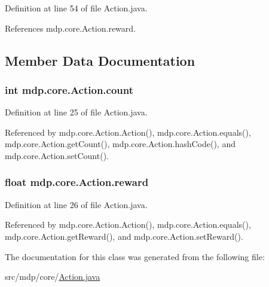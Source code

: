 Definition at line 54 of file Action.\+java.



References mdp.\+core.\+Action.\+reward.



\subsection{Member Data Documentation}
\hypertarget{classmdp_1_1core_1_1_action_a3fd6370ee73fdac8ec8e84e12f02f261}{}
\subsubsection[{count}]{\setlength{\rightskip}{0pt plus 5cm}int mdp.\+core.\+Action.\+count\hspace{0.3cm}{\ttfamily [private]}}\label{classmdp_1_1core_1_1_action_a3fd6370ee73fdac8ec8e84e12f02f261}


Definition at line 25 of file Action.\+java.



Referenced by mdp.\+core.\+Action.\+Action(), mdp.\+core.\+Action.\+equals(), mdp.\+core.\+Action.\+get\+Count(), mdp.\+core.\+Action.\+hash\+Code(), and mdp.\+core.\+Action.\+set\+Count().

\hypertarget{classmdp_1_1core_1_1_action_a6eb542e734aab31ad3c0af8eb7c6f92f}{}
\subsubsection[{reward}]{\setlength{\rightskip}{0pt plus 5cm}float mdp.\+core.\+Action.\+reward\hspace{0.3cm}{\ttfamily [private]}}\label{classmdp_1_1core_1_1_action_a6eb542e734aab31ad3c0af8eb7c6f92f}


Definition at line 26 of file Action.\+java.



Referenced by mdp.\+core.\+Action.\+Action(), mdp.\+core.\+Action.\+equals(), mdp.\+core.\+Action.\+get\+Reward(), and mdp.\+core.\+Action.\+set\+Reward().



The documentation for this class was generated from the following file\+:\begin{DoxyCompactItemize}
\item 
src/mdp/core/\hyperlink{_action_8java}{Action.\+java}\end{DoxyCompactItemize}
